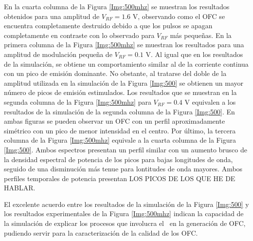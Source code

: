 		En la cuarta columna de la Figura \ref{Img:500mhz} se muestran los resultados obtenidos para una amplitud de $V_{RF} = 1.6$ V, observando como el OFC se encuentra completamente destruido debido a que los pulsos se apagan completamente en contraste con lo observado para $V_{RF}$ más pequeñas. En la primera columna de la Figura \ref{Img:500mhz} se muestran los resultados para una amplitud de modulación pequeña de $V_{RF} = 0.1$ V. Al igual que en los resultados de la simulación, se obtiene un comportamiento similar al de la corriente continua con un pico de emisi\'on dominante. No obstante, al tratarse del doble de la amplitud utilizada en la simulaci\'on de la Figura \ref{Img:500} se obtienen un mayor n\'umero de picos de emisión estimulados. Los resultados que se muestran en la segunda columna de la Figura \ref{Img:500mhz}  para $V_{RF} = 0.4$ V equivalen a los resultados de la simulación de la segunda columna de la Figura \ref{Img:500}. En ambas figuras se pueden observar un OFC con un perfil aproximadamente sim\'etrico con un pico de menor intensidad en el centro. Por \'ultimo, la tercera columna de la Figura \ref{Img:500mhz} equivale a la cuarta columna de la Figura \ref{Img:500}. Ambos espectros presentan un perfil similar con un aumento brusco de la densidad espectral de potencia de los picos para bajas longitudes de onda, seguido de una disminuci\'on m\'as tenue para lontitudes de onda mayores. Ambos perfiles temporales de potencia presentan LOS PICOS DE LOS QUE HE DE HABLAR.

	El excelente acuerdo entre los resultados de la simulaci\'on de la Figura \ref{Img:500} y los resultados experimentales de la Figura \ref{Img:500mhz} indican la capacidad de la simulaci\'on de explicar los procesos que involucra el \gs\ en la generaci\'on de OFC, pudiendo servir para la caracterizaci\'on de la calidad de los OFC.
